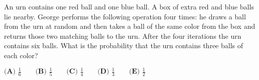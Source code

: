 An urn contains one red ball and one blue ball. A box of extra red and blue balls lie nearby. George performs the following operation four times: he draws a ball from the urn at random and then takes a ball of the same color from the box and returns those two matching balls to the urn. After the four iterations the urn contains six balls. What is the probability that the urn contains three balls of each color? 

$\textbf{(A) } \frac16 \qquad \textbf{(B) }\frac15 \qquad \textbf{(C) } \frac14 \qquad \textbf{(D) } \frac13 \qquad \textbf{(E) } \frac12$